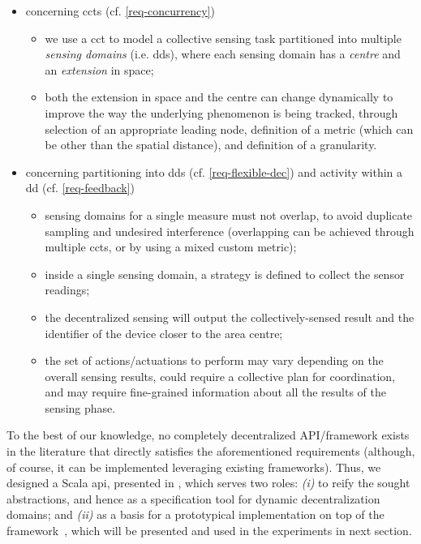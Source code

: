 \begin{itemize}
\item concerning \acp{cct} (cf. \ref{req-concurrency})
	\begin{itemize}
    \item we use a \ac{cct} to model a collective sensing task partitioned into multiple \emph{sensing domains} (i.e. \acp{dd}),
    where each sensing domain has a \emph{centre} and an \emph{extension} in space;
    \item both the extension in space and the centre can change dynamically to improve the way the underlying phenomenon is being tracked,
    through selection of an appropriate leading node,
    definition of a metric (which can be other than the spatial distance),
    and definition of a granularity.
	\end{itemize}
\item concerning partitioning into \acp{dd} (cf. \ref{req-flexible-dec}) and activity within a \ac{dd} (cf. \ref{req-feedback})
    \begin{itemize}
    \item sensing domains for a single measure must not overlap,
    to avoid duplicate sampling and undesired interference
    (overlapping can be achieved through multiple \acp{cct},
    or by using a mixed custom metric);
    \item inside a single sensing domain, a strategy is defined to collect the sensor readings;
    \item the decentralized sensing will output the collectively-sensed result and
      the identifier of the device closer to the area centre;
    \item the set of actions/actuations to perform may vary depending on the overall sensing results,
    could require a collective plan for coordination,
    and may require fine-grained information about all the results of the sensing phase.
	\end{itemize}
\end{itemize}

To the best of our knowledge,
no completely decentralized API/framework exists in the literature that directly satisfies the aforementioned requirements
(although, of course, it can be implemented leveraging existing frameworks).
Thus,
we designed a Scala \ac{api}, presented in , which serves two roles:
\emph{(i)} to reify the sought abstractions, and hence as a specification tool for dynamic decentralization domains; and
\emph{(ii)} as a basis for a prototypical implementation on top of the \scafi{} framework~\cite{DBLP:journals/eaai/CasadeiVAPD21,DBLP:conf/isola/CasadeiVAD20},
which will be presented and used in the experiments in next section.
%

